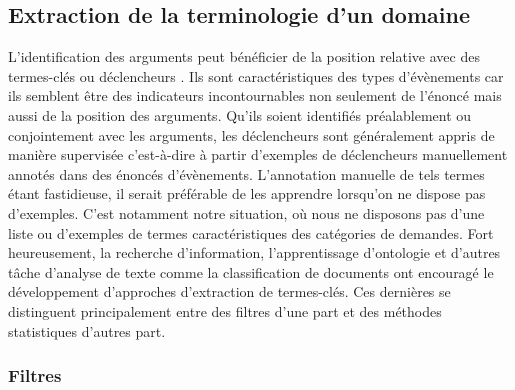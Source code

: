 \subsection{Extraction de la terminologie d'un domaine}
L'identification des arguments peut bénéficier de la position relative avec des termes-clés ou \og déclencheurs \fg{}. Ils sont caractéristiques des types d'évènements car ils semblent être des indicateurs incontournables non seulement de l'énoncé mais aussi de la position des arguments. Qu'ils soient identifiés préalablement ou conjointement avec les arguments, les déclencheurs sont généralement appris de manière supervisée c'est-à-dire à partir d'exemples  de déclencheurs manuellement annotés dans des énoncés d'évènements. L'annotation manuelle de tels termes étant fastidieuse, il serait préférable de les apprendre lorsqu'on ne dispose pas d'exemples. C'est notamment notre situation, où nous ne disposons pas d'une liste ou d'exemples de termes caractéristiques des catégories de demandes. Fort heureusement, la recherche d'information, l'apprentissage d'ontologie et d'autres tâche d'analyse de texte comme la classification de documents ont encouragé le développement d'approches d'extraction de termes-clés. Ces dernières se distinguent principalement entre des filtres d'une part et des méthodes statistiques d'autres part.


\subsubsection{Filtres}
